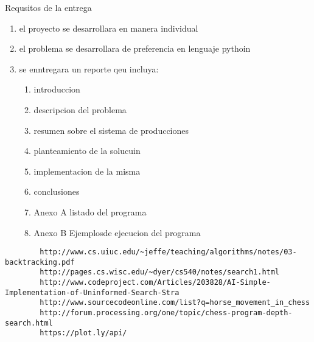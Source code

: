 \documentclass{article}
\begin{document}
    \begin{section}{ Requsitos de la entrega}
        \begin{enumerate}
            \item el proyecto se desarrollara en manera individual
            \item el problema se desarrollara de preferencia en lenguaje pythoin
            \item se enntregara un reporte qeu incluya:
            \begin{enumerate}
              \item introduccion
              \item descripcion del problema
              \item resumen sobre el sistema de producciones
              \item planteamiento de la solucuin
              \item implementacion de la misma
              \item conclusiones
              \item Anexo A listado del programa
              \item Anexo B Ejemplosde ejecucion del programa
            \end{enumerate}
        \end{enumerate}
    \end{section}
    \begin{verbatim}
        http://www.cs.uiuc.edu/~jeffe/teaching/algorithms/notes/03-backtracking.pdf
        http://pages.cs.wisc.edu/~dyer/cs540/notes/search1.html
        http://www.codeproject.com/Articles/203828/AI-Simple-Implementation-of-Uninformed-Search-Stra
        http://www.sourcecodeonline.com/list?q=horse_movement_in_chess
        http://forum.processing.org/one/topic/chess-program-depth-search.html
        https://plot.ly/api/
    \end{verbatim}
\end{document}
